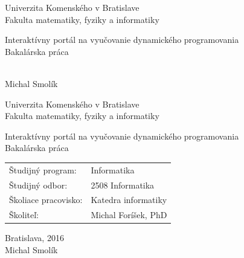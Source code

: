 \documentclass[12pt, oneside]{book}
\def\mfrok{2016}
\def\mfnazov{Interaktívny portál na vyučovanie dynamického programovania}
\def\mftyp{Bakalárska práca}
\def\mfautor{Michal Smolík}
\def\mfskolitel{Michal Foríšek, PhD }
\def\mfmiesto{Bratislava, \mfrok}
\def\mfodbor{2508 Informatika}
\def\program{ Informatika }
\def\mfpracovisko{ Katedra informatiky }
\begin{document}
     

\thispagestyle{empty}

\begin{center}
\sc\large
Univerzita Komenského v Bratislave\\
Fakulta matematiky, fyziky a informatiky

\vfill

{\LARGE\mfnazov}\\
\mftyp
\end{center}

\vfill

{\sc\large 
\noindent \mfrok\\
\mfautor
}

\eject %


\thispagestyle{empty}
\noindent

\begin{center}
\sc  
\large
Univerzita Komenského v Bratislave\\
Fakulta matematiky, fyziky a informatiky

\vfill

{\LARGE\mfnazov}\\
\mftyp
\end{center}

\vfill

\noindent
\begin{tabular}{ll}
Študijný program: & \program \\
Študijný odbor: & \mfodbor \\
Školiace pracovisko: & \mfpracovisko \\
Školiteľ: & \mfskolitel \\
\end{tabular}

\vfill


\noindent \mfmiesto\\
\mfautor

\eject %




\end{document}

